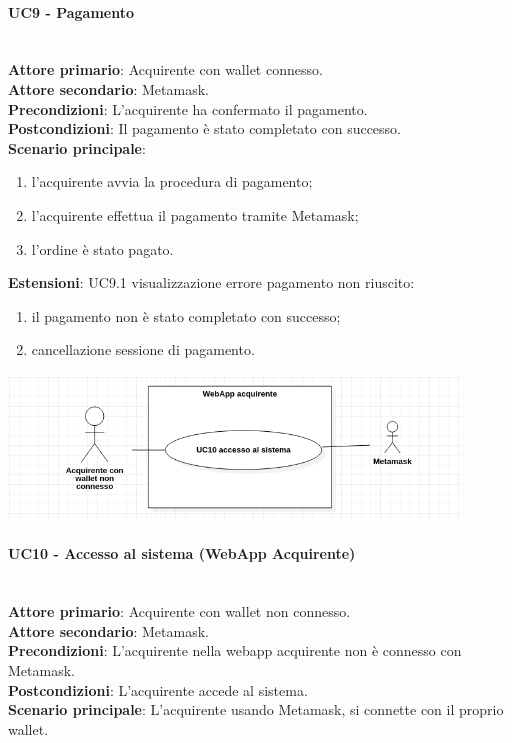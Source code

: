 \documentclass[a4paper, 12pt]{article}
\begin{document}
\paragraph{UC9 - Pagamento}\\
\textbf{Attore primario}: Acquirente con wallet connesso.\\
\textbf{Attore secondario}: Metamask.\\
\textbf{Precondizioni}: L'acquirente ha confermato il pagamento.\\
\textbf{Postcondizioni}: Il pagamento è stato completato con successo.\\
\textbf{Scenario principale}:
\begin{enumerate}
    \item l'acquirente avvia la procedura di pagamento;
    \item l'acquirente effettua il pagamento tramite Metamask;
    \item l'ordine è stato pagato.
\end{enumerate}
\textbf{Estensioni}:
UC9.1 visualizzazione errore pagamento non riuscito:
\begin{enumerate}
    \item il pagamento non è stato completato con successo;
    \item cancellazione sessione di pagamento.
\end{enumerate}

\includegraphics[width=0.9\textwidth]{UC_WAA1}

\paragraph{UC10 - Accesso al sistema (WebApp Acquirente)}\\
\textbf{Attore primario}: Acquirente con wallet non connesso.\\
\textbf{Attore secondario}: Metamask.\\
\textbf{Precondizioni}: L'acquirente nella webapp acquirente non è connesso con Metamask.\\
\textbf{Postcondizioni}: L'acquirente accede al sistema.\\
\textbf{Scenario principale}:
L'acquirente usando Metamask, si connette con il proprio wallet.
\end{document}
